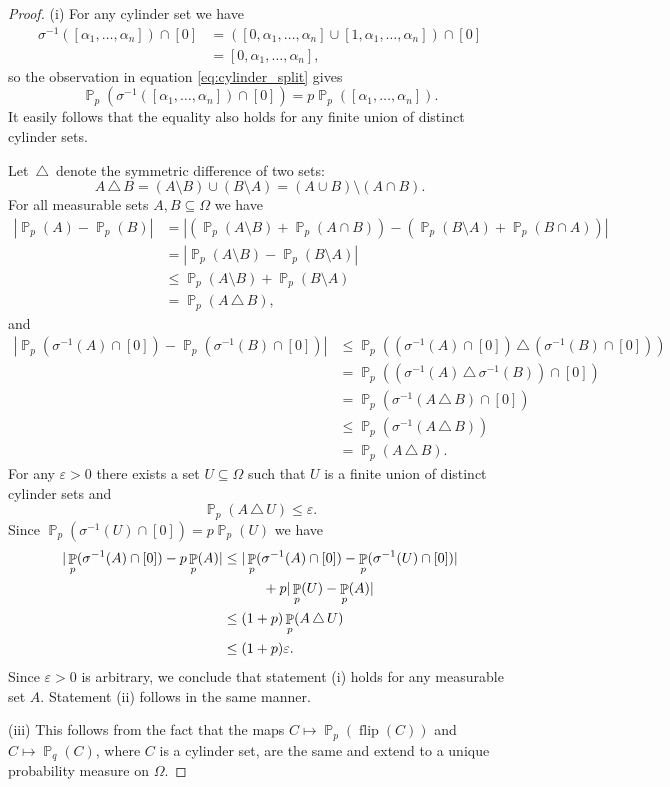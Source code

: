 \documentclass[a4paper,12pt]{article}
\DeclareMathOperator{\prob}{\mathbb{P}}
\DeclareMathOperator{\rec}{flip}
\newcommand{\symmdiff}{\,\triangle\,}
\begin{document}
\begin{proof}
(i) For any cylinder set we have
\[
\begin{split}
\sigma^{-1}([\alpha_1,\dots,\alpha_n]) \cap [0]
	& = ([0,\alpha_1,\dots,\alpha_n] \cup [1,\alpha_1,\dots,\alpha_n]) \cap [0] \\
	& = [0,\alpha_1,\dots,\alpha_n],
\end{split}
\]
so the observation in equation \eqref{eq:cylinder_split} gives
\[
\prob_p(\sigma^{-1}([\alpha_1,\dots,\alpha_n]) \cap [0]) = p\prob_p([\alpha_1,\dots,\alpha_n]).
\]
It easily follows that the equality also holds for any finite union of distinct cylinder sets.

Let $\symmdiff$ denote the symmetric difference of two sets:
\[
A \symmdiff B = (A \setminus B) \cup (B \setminus A) = (A \cup B) \setminus (A \cap B).
\]
For all measurable sets $A, B \subseteq \Omega$ we have
\[
\begin{split}
|\prob_p(A) - \prob_p(B)|
	& = |(\prob_p(A \setminus B) + \prob_p(A \cap B)) - (\prob_p(B \setminus A) + \prob_p(B \cap A))| \\
	& = |\prob_p(A \setminus B) - \prob_p(B \setminus A)| \\
	& \leq \prob_p(A \setminus B) + \prob_p(B \setminus A) \\
	& = \prob_p(A \symmdiff B),
\end{split}
\]
and
\[
\begin{split}
|\prob_p(\sigma^{-1}(A) \cap [0]) - \prob_p(\sigma^{-1}(B) \cap [0])|
	& \leq \prob_p((\sigma^{-1}(A) \cap [0]) \symmdiff (\sigma^{-1}(B) \cap [0])) \\
	& = \prob_p((\sigma^{-1}(A) \symmdiff \sigma^{-1}(B)) \cap [0]) \\
	& = \prob_p(\sigma^{-1}(A \symmdiff B) \cap [0]) \\
	& \leq \prob_p(\sigma^{-1}(A \symmdiff B)) \\
	& = \prob_p(A \symmdiff B).
\end{split}
\]
For any $\varepsilon>0$ there exists a set $U \subseteq \Omega$ such that $U$ is a finite union of distinct cylinder sets and
\[
\prob_p(A \symmdiff U) \leq \varepsilon.
\]
Since $\prob_p(\sigma^{-1}(U) \cap [0]) = p\prob_p(U)$ we have
\[
\begin{split}
|\prob_p(\sigma^{-1}(A) \cap [0]) - p\prob_p(A)|
	& \leq |\prob_p(\sigma^{-1}(A) \cap [0]) - \prob_p(\sigma^{-1}(U) \cap [0])| \\
	& \hspace{10mm} + p|\prob_p(U) - \prob_p(A)| \\
	& \leq (1+p) \prob_p(A \symmdiff U) \\
	& \leq (1+p)\varepsilon.
\end{split}
\]
Since $\varepsilon>0$ is arbitrary, we conclude that statement (i) holds for any measurable set $A$. Statement (ii) follows in the same manner.

(iii) This follows from the fact that the maps $C \mapsto \prob_p(\rec(C))$ and $C \mapsto \prob_q(C)$, where $C$ is a cylinder set, are the same and extend to a unique probability measure on $\Omega$.
\end{proof}
\end{document}
